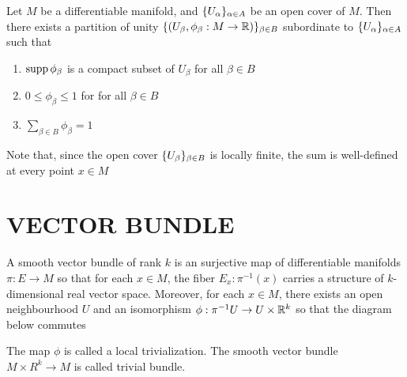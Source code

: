 \begin{lemma}
	Let $M$ be a differentiable manifold, and $\{U_\alpha\}_{\alpha \in A}$ be an open cover of $M$. Then there exists a partition of unity $\{(U_\beta, \phi_\beta: M \to \mathbb{R})\}_{\beta \in B}$ subordinate to $\{U_\alpha\}_{\alpha \in A}$ such that
	\begin{enumerate}
		\item $\operatorname{supp} \phi_\beta$ is a compact subset of $U_\beta$ for all $\beta \in B$
		\item $0 \leq \phi_\beta \leq 1$ for for all $\beta \in B$
		\item $\sum_{\beta \in B} \phi_\beta = 1$
	\end{enumerate}
	
	Note that, since the open cover $\{U_\beta\}_{\beta \in B}$ is locally finite, the sum is well-defined at every point $x \in M$
\end{lemma}

\section{VECTOR BUNDLE}

\begin{definition}
	A smooth vector bundle of rank $k$ is an surjective map of differentiable manifolds $\pi: E \to M$ so that for each $x \in M$, the fiber $E_x: \pi^{-1}(x)$ carries a structure of $k$-dimensional real vector space. Moreover, for each $x \in M$, there exists an open neighbourhood $U$ and an isomorphism $\phi: \pi^{-1} U \to U \times \mathbb{R}^k$ so that the diagram below commutes
	\begin{center}
	\end{center}
	
	The map $\phi$ is called a local trivialization. The smooth vector bundle $M \times R^k \to M$ is called trivial bundle.
\end{definition}

